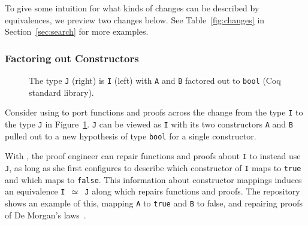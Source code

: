 To give some intuition for what kinds of changes can be described by equivalences, we preview two changes below.
See Table~\ref{fig:changes} in Section~\ref{sec:search} for more examples.

\subsubsection*{Factoring out Constructors}
\label{sec:ex1}

\begin{figure}
\begin{minipage}{0.48\columnwidth}

\end{minipage}
\hfill
\begin{minipage}{0.48\columnwidth}

\end{minipage}
\vspace{-0.4cm}
\caption{The type \lstinline{J} (right) is \lstinline{I} (left) with \lstinline{A} and \lstinline{B} factored out to \lstinline{bool} (Coq standard library).}
\label{fig:equivalence2}
\end{figure}

Consider using \toolname to port functions and proofs across the change from the type \lstinline{I} to the type \lstinline{J} 
in Figure~\ref{fig:equivalence2}.
\lstinline{J} can be viewed as \lstinline{I} with its two constructors \lstinline{A} and \lstinline{B} pulled out to a
new hypothesis of type \lstinline{bool} for a single constructor.

With \toolname, the proof engineer can repair functions and proofs about \lstinline{I} to instead use \lstinline{J},
as long as she first configures \toolname to describe which constructor 
of \lstinline{I} maps to \lstinline{true} and which maps to \lstinline{false}.
This information about constructor mappings induces an equivalence \lstinline{I }$\simeq$\lstinline{ J}
along which \toolname repairs functions and proofs.
The repository shows an example of this, mapping \lstinline{A} to \lstinline{true} and \lstinline{B} to false,
and repairing proofs of De Morgan's laws~. %
%

